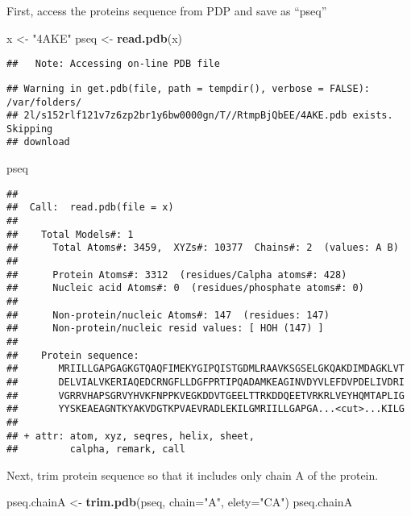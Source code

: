 \documentclass[]{article}
\newenvironment{Shaded}{\begin{snugshade}}{\end{snugshade}}
\newcommand{\KeywordTok}[1]{\textcolor[rgb]{0.13,0.29,0.53}{\textbf{#1}}}
\newcommand{\DataTypeTok}[1]{\textcolor[rgb]{0.13,0.29,0.53}{#1}}
\newcommand{\StringTok}[1]{\textcolor[rgb]{0.31,0.60,0.02}{#1}}
\newcommand{\NormalTok}[1]{#1}
\begin{document}
First, access the proteins sequence from PDP and save as ``pseq''

\begin{Shaded}
\begin{Highlighting}[]
\NormalTok{x <-}\StringTok{ "4AKE"}
\NormalTok{pseq <-}\StringTok{ }\KeywordTok{read.pdb}\NormalTok{(x)}
\end{Highlighting}
\end{Shaded}

\begin{verbatim}
##   Note: Accessing on-line PDB file
\end{verbatim}

\begin{verbatim}
## Warning in get.pdb(file, path = tempdir(), verbose = FALSE): /var/folders/
## 2l/s152rlf121v7z6zp2br1y6bw0000gn/T//RtmpBjQbEE/4AKE.pdb exists. Skipping
## download
\end{verbatim}

\begin{Shaded}
\begin{Highlighting}[]
\NormalTok{pseq}
\end{Highlighting}
\end{Shaded}

\begin{verbatim}
## 
##  Call:  read.pdb(file = x)
## 
##    Total Models#: 1
##      Total Atoms#: 3459,  XYZs#: 10377  Chains#: 2  (values: A B)
## 
##      Protein Atoms#: 3312  (residues/Calpha atoms#: 428)
##      Nucleic acid Atoms#: 0  (residues/phosphate atoms#: 0)
## 
##      Non-protein/nucleic Atoms#: 147  (residues: 147)
##      Non-protein/nucleic resid values: [ HOH (147) ]
## 
##    Protein sequence:
##       MRIILLGAPGAGKGTQAQFIMEKYGIPQISTGDMLRAAVKSGSELGKQAKDIMDAGKLVT
##       DELVIALVKERIAQEDCRNGFLLDGFPRTIPQADAMKEAGINVDYVLEFDVPDELIVDRI
##       VGRRVHAPSGRVYHVKFNPPKVEGKDDVTGEELTTRKDDQEETVRKRLVEYHQMTAPLIG
##       YYSKEAEAGNTKYAKVDGTKPVAEVRADLEKILGMRIILLGAPGA...<cut>...KILG
## 
## + attr: atom, xyz, seqres, helix, sheet,
##         calpha, remark, call
\end{verbatim}

Next, trim protein sequence so that it includes only chain A of the
protein.

\begin{Shaded}
\begin{Highlighting}[]
\NormalTok{pseq.chainA <-}\StringTok{ }\KeywordTok{trim.pdb}\NormalTok{(pseq, }\DataTypeTok{chain=}\StringTok{"A"}\NormalTok{, }\DataTypeTok{elety=}\StringTok{"CA"}\NormalTok{)}
\NormalTok{pseq.chainA}
\end{Highlighting}
\end{Shaded}
\end{document}
